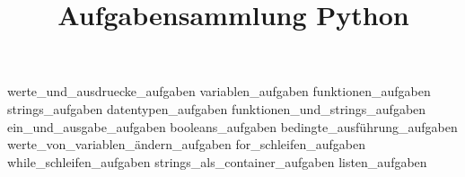 \documentclass[a4paper, DIV = calc]{scrartcl}
\title{Aufgabensammlung Python}
\begin{document}
{}
\maketitle
\tableofcontents
\pagebreak
{}


{werte_und_ausdruecke_aufgaben}
\pagebreak
{variablen_aufgaben}
\pagebreak
{funktionen_aufgaben}
\pagebreak
{strings_aufgaben}
\pagebreak
{datentypen_aufgaben}
\pagebreak
{funktionen_und_strings_aufgaben}
\pagebreak
{ein_und_ausgabe_aufgaben}
\pagebreak
{booleans_aufgaben}
\pagebreak
{bedingte_ausführung_aufgaben}
\pagebreak
{werte_von_variablen_ändern_aufgaben}
\pagebreak
{for_schleifen_aufgaben}
\pagebreak
{while_schleifen_aufgaben}
\pagebreak
{strings_als_container_aufgaben}
\pagebreak
{listen_aufgaben}
\pagebreak
\end{document}
